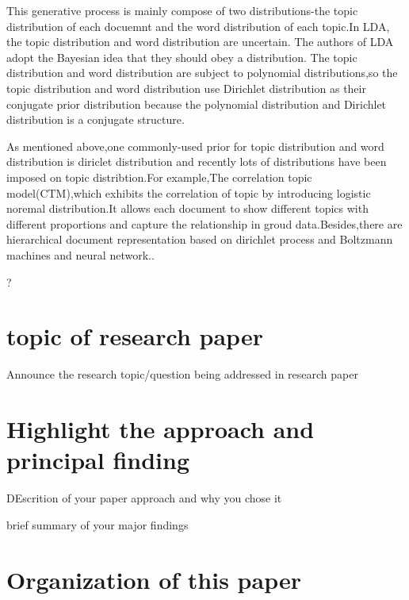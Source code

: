 This generative process is mainly compose of two distributions-the topic distribution of each docuemnt and the word distribution of each topic.In LDA, the topic distribution and word distribution are uncertain. The authors of LDA adopt the Bayesian idea that they should obey a distribution. The topic distribution and word distribution are subject to  polynomial distributions,so the topic distribution and word distribution use Dirichlet distribution as their conjugate prior distribution because the polynomial distribution and Dirichlet distribution is a conjugate structure.

As mentioned above,one commonly-used prior for topic distribution and word distribution is diriclet distribution and recently lots of distributions have been imposed on topic distribtion.For example,The correlation topic model(CTM)\cite{corr},which exhibits the correlation of topic by introducing logistic noremal distribution.It allows each document to show different topics with different proportions and capture the relationship in groud data.Besides,there are hierarchical document representation based on dirichlet process and Boltzmann machines and neural network.\cite{zhao}.



?

\section{topic of research paper}
Announce the research topic/question being addressed in research paper


\section{Highlight the approach and principal finding}

DEscrition of your paper approach and why you chose it

brief summary of your major findings

\section{Organization of this paper}
